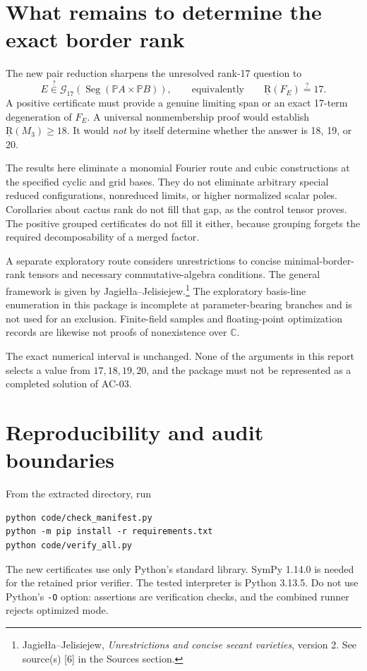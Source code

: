 \documentclass[11pt]{article}
\theoremstyle{definition}\newtheorem{definition}[theorem]{Definition}
\theoremstyle{remark}\newtheorem{remark}[theorem]{Remark}
\newcommand{\C}{\mathbb C}
\newcommand{\PP}{\mathbb P}
\newcommand{\br}{\underline{\mathrm R}}
\newcommand{\Seg}{\operatorname{Seg}}
\newcommand{\calG}{\mathcal G}
\newcommand{\src}[2]{\footnote{#1. See source(s) [#2] in the Sources section.}}
\begin{document}
\section{What remains to determine the exact border rank}

The new pair reduction sharpens the unresolved rank-17 question to
\begin{equation}\label{eq:remaining}
 E\stackrel{?}{\in}\calG_{17}(\Seg(\PP A\times\PP B)),
 \qquad\text{equivalently}\qquad \br(F_E)\stackrel{?}{=}17.
\end{equation}
A positive certificate must provide a genuine limiting span or an exact
17-term degeneration of $F_E$. A universal nonmembership proof would
establish $\br(M_3)\geq18$. It would \emph{not} by itself determine whether
the answer is 18, 19, or 20.

The results here eliminate a monomial Fourier route and cubic constructions
at the specified cyclic and grid bases. They do not eliminate arbitrary
special reduced configurations, nonreduced limits, or higher normalized
scalar poles. Corollaries about cactus rank do not fill that gap, as the
control tensor proves. The positive grouped certificates do not fill it
either, because grouping forgets the required decomposability of a merged
factor.

A separate exploratory route considers unrestrictions to concise
minimal-border-rank tensors and necessary commutative-algebra conditions.
The general framework is given by Jagie\l\l a--Jelisiejew.\src{Jagie\l\l a--Jelisiejew,
\emph{Unrestrictions and concise secant varieties}, version 2}{6}
The exploratory basis-line enumeration in this package is incomplete at
parameter-bearing branches and is not used for an exclusion. Finite-field
samples and floating-point optimization records are likewise not proofs of
nonexistence over $\C$.

The exact numerical interval is unchanged. None of the arguments in this
report selects a value from $17,18,19,20$, and the package must not be
represented as a completed solution of AC-03.

\section{Reproducibility and audit boundaries}

From the extracted directory, run
\begin{Verbatim}[fontsize=\small]
python code/check_manifest.py
python -m pip install -r requirements.txt
python code/verify_all.py
\end{Verbatim}
The new certificates use only Python's standard library. SymPy 1.14.0 is
needed for the retained prior verifier. The tested interpreter is Python
3.13.5. Do not use Python's \texttt{-O} option: assertions are verification
checks, and the combined runner rejects optimized mode.
\end{document}
